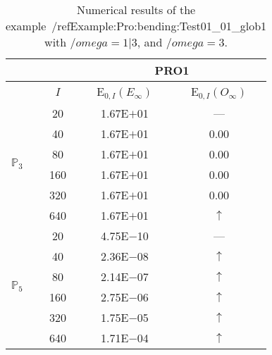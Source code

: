 \begin{table}[H]
\caption{Numerical results of the example~/ref{Example:Pro:bending:Test01_01_glob1} with $/omega=1|3$, and $/omega=3$.}
\setlength{\tabcolsep}{5pt}
\centering
\begin{tabular}{@{}l c c c@{}}
\toprule
 &  & \multicolumn{2}{c}{PRO1}\\
\midrule
 & $I$ & E$_{0,I}(E_{\infty})$ & E$_{0,I}(O_{\infty})$\\
\midrule
\multirow{6}{*}{$\mathbb{P}_{3}$}
 & 20 & 1.67E$+$01 & ---\\
 & 40 & 1.67E$+$01 & 0.00\\
 & 80 & 1.67E$+$01 & 0.00\\
 & 160 & 1.67E$+$01 & 0.00\\
 & 320 & 1.67E$+$01 & 0.00\\
 & 640 & 1.67E$+$01 & $\uparrow$\\
\midrule
\multirow{6}{*}{$\mathbb{P}_{5}$}
 & 20 & 4.75E$-$10 & ---\\
 & 40 & 2.36E$-$08 & $\uparrow$\\
 & 80 & 2.14E$-$07 & $\uparrow$\\
 & 160 & 2.75E$-$06 & $\uparrow$\\
 & 320 & 1.75E$-$05 & $\uparrow$\\
 & 640 & 1.71E$-$04 & $\uparrow$\\
\bottomrule
\end{tabular}
\label{Table:PRO:test_01_01_test11_pro1}
\end{table}
